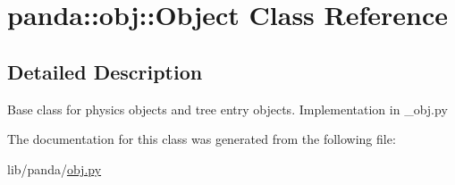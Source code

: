 \hypertarget{classpanda_1_1obj_1_1Object}{
\section{panda::obj::Object Class Reference}
\label{classpanda_1_1obj_1_1Object}
}


\subsection{Detailed Description}
\begin{DoxyVerb}
Base class for physics objects and tree entry objects.
Implementation in _obj.py
\end{DoxyVerb}
 

The documentation for this class was generated from the following file:\begin{DoxyCompactItemize}
\item 
lib/panda/\hyperlink{obj_8py}{obj.py}\end{DoxyCompactItemize}
